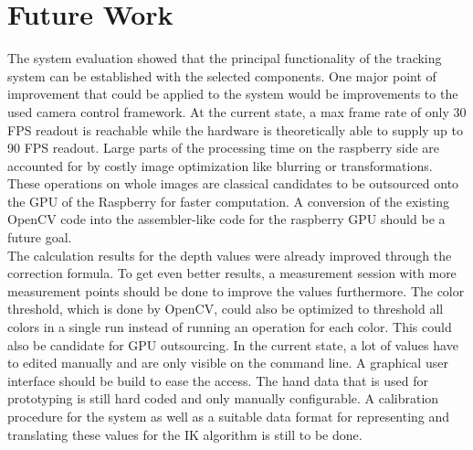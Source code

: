 \chapter{Future Work}
The system evaluation showed that the principal functionality of the tracking system can be established with the selected components. One major point of improvement that could be applied to the system would be improvements to the used camera control framework. At the current state, a max frame rate of only 30 FPS readout is reachable while the hardware is theoretically able to supply up to 90 FPS readout. 
Large parts of the processing time on the raspberry side are accounted for by costly image optimization like blurring or transformations. These operations on whole images are classical candidates to be outsourced onto the GPU of the Raspberry for faster computation. A conversion of the existing OpenCV code into the assembler-like code for the raspberry GPU should be a future goal.\\
The calculation results for the depth values were already improved through the correction formula. To get even better results, a measurement session with more measurement points should be done to improve the values furthermore.
The color threshold, which is done by OpenCV, could also be optimized to threshold all colors in a single run instead of running an operation for each color. This could also be candidate for GPU outsourcing.
In the current state, a lot of values have to edited manually and are only visible on the command line. A graphical user interface should be build to ease the access.
The hand data that is used for prototyping is still hard coded and only manually configurable. A calibration procedure for the system as well as a suitable data format for representing and translating these values for the IK algorithm is still to be done.
